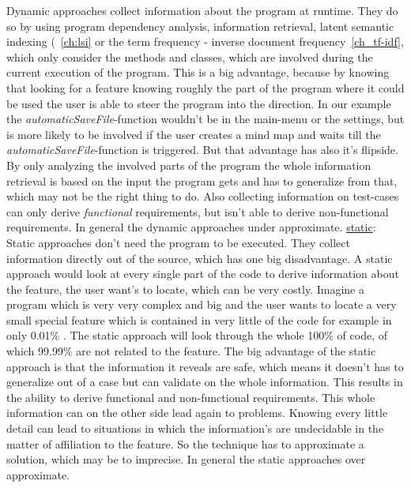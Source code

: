 Dynamic approaches collect information about the program at runtime. They do so by using program dependency analysis, information retrieval, latent semantic indexing (~\ref{ch:lsi} or the term frequency - inverse document frequency{~\ref{ch_tf-idf}, which only consider the methods and classes, which are involved during the current execution of the program. This is a big advantage, because by knowing that looking for a feature knowing roughly the part of the program where it could be used the user is able to steer the program into the direction. In our example the \emph{automaticSaveFile}-function wouldn't be in the main-menu or the settings, but is more likely to be involved if the user creates a mind map and waits till the \emph{automaticSaveFile}-function is triggered. But that advantage has also it's flipside. By only analyzing the involved parts of the program the whole information retrieval is based on the input the program gets and has to generalize from that, which may not be the right thing to do. Also collecting information on test-cases can only derive \emph{functional} requirements, but isn't able to derive non-functional requirements. In general the dynamic approaches under approximate.\newline
\underline{static}:\newline
Static approaches don't need the program to be executed. They collect information directly out of the source, which has  one big disadvantage. A static approach would look at every single part of the code to derive information about the feature, the user want's to locate, which can be very costly. Imagine a program which is very very complex and big and the user wants to locate a very small special feature which is contained in very little of the code for example in only 0.01\% . The static approach will look through the whole 100\% of code, of which 99.99\% are not related to the feature. The big advantage of the static approach is that the information it reveals are safe, which means it doesn't has to generalize out of a case but can validate on the whole information. This results in the ability to derive functional and non-functional requirements. This whole information can on the other side lead again to problems. Knowing every little detail can lead to situations in which the information's are undecidable in the matter of affiliation to the feature. So the technique has to approximate a solution, which may be to imprecise. In general the static approaches over approximate. \newline
\\
}
